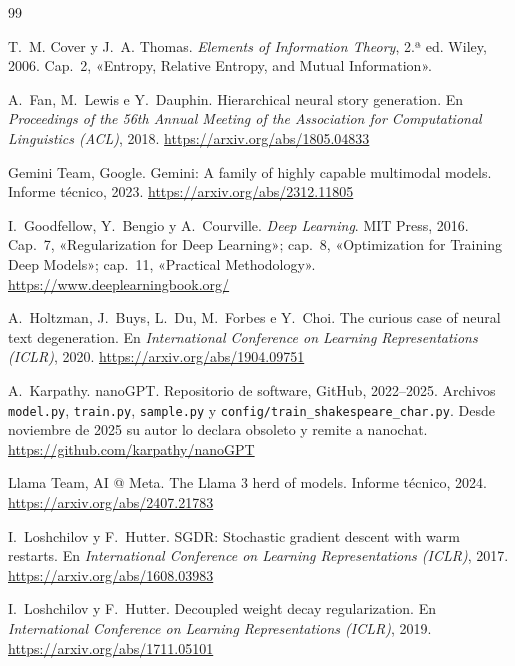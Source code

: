 \begin{thebibliography}{99}
\small

T.~M. Cover y J.~A. Thomas.
\newblock \emph{Elements of Information Theory}, 2.ª ed.
\newblock Wiley, 2006.
\newblock Cap.~2, «Entropy, Relative Entropy, and Mutual Information».

A.~Fan, M.~Lewis e Y.~Dauphin.
\newblock Hierarchical neural story generation.
\newblock En \emph{Proceedings of the 56th Annual Meeting of the Association for Computational Linguistics (ACL)}, 2018.
\newblock \url{https://arxiv.org/abs/1805.04833}

Gemini Team, Google.
\newblock Gemini: A family of highly capable multimodal models.
\newblock Informe técnico, 2023.
\newblock \url{https://arxiv.org/abs/2312.11805}

I.~Goodfellow, Y.~Bengio y A.~Courville.
\newblock \emph{Deep Learning}.
\newblock MIT Press, 2016.
\newblock Cap.~7, «Regularization for Deep Learning»; cap.~8, «Optimization for Training Deep Models»; cap.~11, «Practical Methodology».
\newblock \url{https://www.deeplearningbook.org/}

A.~Holtzman, J.~Buys, L.~Du, M.~Forbes e Y.~Choi.
\newblock The curious case of neural text degeneration.
\newblock En \emph{International Conference on Learning Representations (ICLR)}, 2020.
\newblock \url{https://arxiv.org/abs/1904.09751}

A.~Karpathy.
\newblock nanoGPT.
\newblock Repositorio de software, GitHub, 2022--2025. Archivos \texttt{model.py}, \texttt{train.py}, \texttt{sample.py} y \texttt{config/train\_shakespeare\_char.py}. Desde noviembre de 2025 su autor lo declara obsoleto y remite a nanochat.
\newblock \url{https://github.com/karpathy/nanoGPT}

Llama Team, AI @ Meta.
\newblock The Llama 3 herd of models.
\newblock Informe técnico, 2024.
\newblock \url{https://arxiv.org/abs/2407.21783}

I.~Loshchilov y F.~Hutter.
\newblock SGDR: Stochastic gradient descent with warm restarts.
\newblock En \emph{International Conference on Learning Representations (ICLR)}, 2017.
\newblock \url{https://arxiv.org/abs/1608.03983}

I.~Loshchilov y F.~Hutter.
\newblock Decoupled weight decay regularization.
\newblock En \emph{International Conference on Learning Representations (ICLR)}, 2019.
\newblock \url{https://arxiv.org/abs/1711.05101}


\end{thebibliography}
